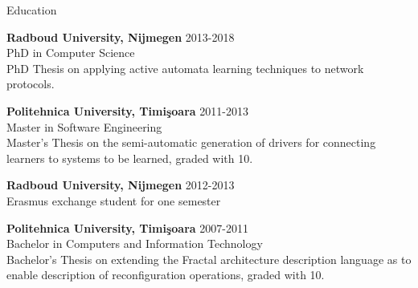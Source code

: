 \documentclass{resume} %
\newcommand{\nwork}[1]{\newblock{\textit{Notable Work:} #1}}
\begin{document}

\begin{rSection}{Education}
\item {\bf Radboud University, Nijmegen} \hfill 2013-2018 \\
PhD in Computer Science \\
PhD Thesis on applying active automata learning techniques to network protocols. 
\smallskip{}
\item {\bf Politehnica University, Timi\c{s}oara} \hfill 2011-2013 \\
Master in Software Engineering \\
Master's Thesis on the semi-automatic generation of drivers for connecting learners to systems to be learned, graded with 10. 
\smallskip{}
\item {\bf Radboud University, Nijmegen} \hfill 2012-2013 \\
Erasmus exchange student for one semester
\smallskip{}
\item {\bf Politehnica University, Timi\c{s}oara} \hfill 2007-2011 \\
Bachelor in Computers and Information Technology \\
Bachelor's Thesis on extending the Fractal architecture description language as to enable description of reconfiguration operations, graded with 10.
\end{rSection}
\end{document}
